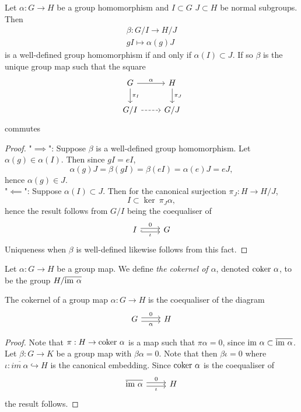 \begin{corollary}\label{WellDefinednessOfQuotientGroupMaps}
    Let $\alpha : G \rightarrow H$ be a group homomorphism and $I\subset G$ $J\subset H$ be normal subgroups. Then 
    \begin{gather*}
        \beta : G/I \rightarrow H/J\\
        gI \mapsto \alpha(g)J    
    \end{gather*}
     is a well-defined group homomorphism if and only if $\alpha(I)\subset J$. If so $\beta$ is the unique group map such that the square
     $$
        \begin{tikzcd}
            G\arrow[r,"\alpha"]\arrow[d, "\pi_I"] & H\arrow[d,"\pi_J"]\\
            G/I \arrow[r, dashrightarrow] & G/J
        \end{tikzcd}
     $$
     commutes
\end{corollary}
\begin{proof}
    "$\implies$": Suppose $\beta$ is a well-defined group homomorphism. Let $\alpha(g)\in \alpha(I)$. Then since $gI = eI$, 
    $$
        \alpha(g)J =\beta(gI) = \beta(eI)=\alpha(e)J = eJ,
    $$
    hence $\alpha(g)\in J$.\\
    "$\impliedby$": Suppose $\alpha(I)\subset J$. Then for the canonical surjection $\pi_J : H\rightarrow H/J$, 
    $$
        I \subset \ker \ \pi_J\alpha,
    $$
    hence the result follows from $G/I$ being the coequaliser of 
    $$
        \begin{tikzcd}
            I \arrow[r, hookrightarrow, shift right=0.5ex, "\iota", swap] \arrow[r, shift left=0.5ex,"0"] & G
        \end{tikzcd} 
    $$
    Uniqueness when $\beta$ is well-defined likewise follows from this fact. 
\end{proof}
\begin{definition}
    Let $\alpha: G\rightarrow H$ be a group map. We define \emph{the cokernel of $\alpha$}, denoted $\coker\ \alpha$, to be the group $H/\overline{\mathrm{im} \ \alpha}$
\end{definition}
\begin{corollary}
    The cokernel of a group map $\alpha : G\rightarrow H$ is the coequaliser of the diagram 
    $$
        \begin{tikzcd}
            G \arrow[r, shift right=0.5ex, "\alpha", swap] \arrow[r, shift left=0.5ex,"0"] & H 
        \end{tikzcd} 
    $$
\end{corollary}
\begin{proof}
    Note that $\pi : H\rightarrow \mathrm{coker } \ \alpha$ is a map such that $\pi \alpha=0$, since $\im\ \alpha \subset \overline{\im\ \alpha}$. Let $\beta: G\rightarrow K$ be a group map with $\beta\alpha = 0$. Note that then $\beta\iota = 0$ where $\iota : \overline{im\ \alpha} \hookrightarrow H$ is the canonical embedding. Since $\coker\ \alpha$ is the coequaliser of 
    $$
        \begin{tikzcd}
            \overline{\im \ \alpha} \arrow[r, shift right=0.5ex, "\iota", swap] \arrow[r, shift left=0.5ex,"0"] & H
        \end{tikzcd}
    $$
    the result follows. 
\end{proof}

